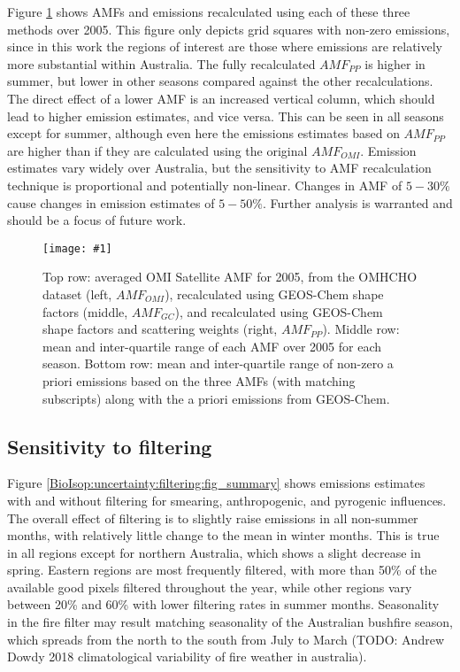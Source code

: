 \documentclass[acp, manuscript]{copernicus}
\newcommand{\mypic}[3]{%
  \begin{figure}
    \texttt{[image: \#1]}
    \caption{#2}
    #3
  \end{figure}
}
\begin{document}
      Figure \ref{BioIsop:uncertainty:recalc:fig_summary} shows AMFs and emissions recalculated using each of these three methods over 2005.
      This figure only depicts grid squares with non-zero emissions, since in this work the regions of interest are those where emissions are relatively more substantial within Australia.
      The fully recalculated $AMF_{PP}$ is higher in summer, but lower in other seasons compared against the other recalculations.
      The direct effect of a lower AMF is an increased vertical column, which should lead to higher emission estimates, and vice versa.
      This can be seen in all seasons except for summer, although even here the emissions estimates based on $AMF_{PP}$ are higher than if they are calculated using the original $AMF_{OMI}$.
      Emission estimates vary widely over Australia, but the sensitivity to AMF recalculation technique is proportional and potentially non-linear.
      Changes in AMF of $5-30\%$ cause changes in emission estimates of $5-50\%$.
      Further analysis is warranted and should be a focus of future work.
      
      
      \mypic{Figures/Sensitivity_recalculation_2005.png}{%
        Top row: averaged OMI Satellite AMF for 2005, from the OMHCHO dataset (left, $AMF_{OMI}$), recalculated using GEOS-Chem shape factors  (middle, $AMF_{GC}$), and recalculated using GEOS-Chem shape factors and scattering weights (right, $AMF_{PP}$).
        Middle row: mean and inter-quartile range of each AMF over 2005 for each season.
        Bottom row: mean and inter-quartile range of non-zero a priori emissions based on the three AMFs (with matching subscripts) along with the a priori emissions from GEOS-Chem.
      }{\label{BioIsop:uncertainty:recalc:fig_summary}}
      
  
    \subsection{Sensitivity to filtering}
    \label{BioIsop:uncertainty:filtering}
    
      Figure \ref{BioIsop:uncertainty:filtering:fig_summary} shows emissions estimates with and without filtering for smearing, anthropogenic, and pyrogenic influences.
      The overall effect of filtering is to slightly raise emissions in all non-summer months, with relatively little change to the mean in winter months.
      This is true in all regions except for northern Australia, which shows a slight decrease in spring.
      Eastern regions are most frequently filtered, with more than 50\% of the available good pixels filtered throughout the year, while other regions vary between 20\% and 60\% with lower filtering rates in summer months.
      Seasonality in the fire filter may result matching seasonality of the Australian bushfire season, which spreads from the north to the south from July to March (TODO: Andrew Dowdy 2018 climatological variability of fire weather in australia).
      
\end{document}
